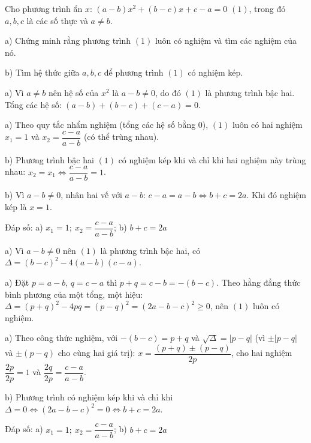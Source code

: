 \begin{problem}[9DS-PT2-027]
Cho phương trình ẩn $x$: $(a - b)x^2 + (b - c)x + c - a = 0$ $(1)$, trong đó $a, b, c$ là các số thực và $a \neq b$.

a) Chứng minh rằng phương trình $(1)$ luôn có nghiệm và tìm các nghiệm của nó.

b) Tìm hệ thức giữa $a, b, c$ để phương trình $(1)$ có nghiệm kép.

\begin{solution}
a) Vì $a \neq b$ nên hệ số của $x^2$ là $a - b \neq 0$, do đó $(1)$ là phương trình bậc hai. Tổng các hệ số: $(a - b) + (b - c) + (c - a) = 0$.

a) Theo quy tắc nhẩm nghiệm (tổng các hệ số bằng $0$), $(1)$ luôn có hai nghiệm $x_1 = 1$ và $x_2 = \dfrac{c - a}{a - b}$ (có thể trùng nhau).

b) Phương trình bậc hai $(1)$ có nghiệm kép khi và chỉ khi hai nghiệm này trùng nhau: $x_2 = x_1 \Leftrightarrow \dfrac{c - a}{a - b} = 1$.

b) Vì $a - b \neq 0$, nhân hai vế với $a - b$: $c - a = a - b \Leftrightarrow b + c = 2a$. Khi đó nghiệm kép là $x = 1$.

Đáp số: a) $\boxed{x_1 = 1;\ x_2 = \dfrac{c - a}{a - b}}$; b) $\boxed{b + c = 2a}$
\end{solution}

\begin{solution}
a) Vì $a - b \neq 0$ nên $(1)$ là phương trình bậc hai, có $\Delta = (b - c)^2 - 4(a - b)(c - a)$.

a) Đặt $p = a - b$, $q = c - a$ thì $p + q = c - b = -(b - c)$. Theo hằng đẳng thức bình phương của một tổng, một hiệu: $\Delta = (p + q)^2 - 4pq = (p - q)^2 = (2a - b - c)^2 \geq 0$, nên $(1)$ luôn có nghiệm.

a) Theo công thức nghiệm, với $-(b - c) = p + q$ và $\sqrt{\Delta} = |p - q|$ (vì $\pm|p - q|$ và $\pm(p - q)$ cho cùng hai giá trị): $x = \dfrac{(p + q) \pm (p - q)}{2p}$, cho hai nghiệm $\dfrac{2p}{2p} = 1$ và $\dfrac{2q}{2p} = \dfrac{c - a}{a - b}$.

b) Phương trình có nghiệm kép khi và chỉ khi $\Delta = 0 \Leftrightarrow (2a - b - c)^2 = 0 \Leftrightarrow b + c = 2a$.

Đáp số: a) $\boxed{x_1 = 1;\ x_2 = \dfrac{c - a}{a - b}}$; b) $\boxed{b + c = 2a}$
\end{solution}
\end{problem}


